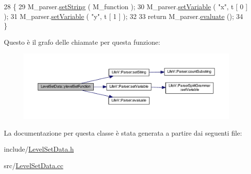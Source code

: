 \begin{DoxyCode}
28 \{
29     M\_parser.\hyperlink{classLifeV_1_1Parser_ac05769e836a0dc95d9c020df361a5194}{setString} ( M\_function );
30     M\_parser.\hyperlink{classLifeV_1_1Parser_aa2b362e12b8feb60231705d499c9fbae}{setVariable} ( \textcolor{stringliteral}{"x"}, t [ 0 ] );
31     M\_parser.\hyperlink{classLifeV_1_1Parser_aa2b362e12b8feb60231705d499c9fbae}{setVariable} ( \textcolor{stringliteral}{"y"}, t [ 1 ] );
32     
33     \textcolor{keywordflow}{return} M\_parser.\hyperlink{classLifeV_1_1Parser_a51d84fd4ae6d420620e7beee58fad673}{evaluate} ();
34 \}
\end{DoxyCode}


Questo è il grafo delle chiamate per questa funzione\-:\nopagebreak
\begin{figure}[H]
\begin{center}
\leavevmode
\includegraphics[width=350pt]{classLevelSetData_a732ae59581206d4f94237e54bc0071e3_cgraph}
\end{center}
\end{figure}




La documentazione per questa classe è stata generata a partire dai seguenti file\-:\begin{DoxyCompactItemize}
\item 
include/\hyperlink{LevelSetData_8h}{Level\-Set\-Data.\-h}\item 
src/\hyperlink{LevelSetData_8cc}{Level\-Set\-Data.\-cc}\end{DoxyCompactItemize}
